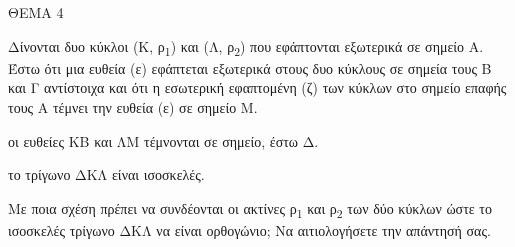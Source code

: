 
ΘΕΜΑ 4

Δίνονται δυο κύκλοι (Κ, ρ\textsubscript{1}) και (Λ, ρ\textsubscript{2}) που εφάπτονται εξωτερικά σε σημείο Α. Έστω ότι μια ευθεία (ε) εφάπτεται εξωτερικά στους δυο κύκλους σε σημεία τους Β και Γ αντίστοιχα και ότι η εσωτερική εφαπτομένη (ζ) των κύκλων στο σημείο επαφής τους Α τέμνει την ευθεία (ε) σε σημείο Μ.

\begin{alist}
\item Να αποδείξετε ότι:

.}
\end{alist}
\begin{alist}
\item
  οι ευθείες ΚΒ και ΛΜ τέμνονται σε σημείο, έστω Δ. 
\item
  το τρίγωνο ΔΚΛ είναι ισοσκελές. 

\item Με ποια σχέση πρέπει να συνδέονται οι ακτίνες ρ\textsubscript{1} και ρ\textsubscript{2} των δύο κύκλων ώστε το ισοσκελές τρίγωνο ΔΚΛ να είναι ορθογώνιο; Να αιτιολογήσετε την απάντησή σας.

\end{alist}
